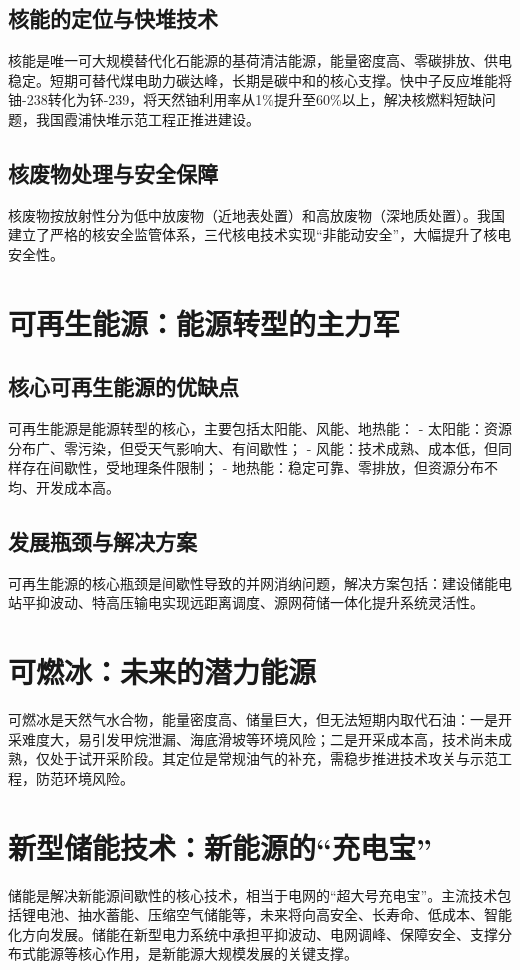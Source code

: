 \documentclass[UTF8,a4paper,12pt]{article}
\begin{document}
\subsection{核能的定位与快堆技术}
核能是唯一可大规模替代化石能源的基荷清洁能源，能量密度高、零碳排放、供电稳定。短期可替代煤电助力碳达峰，长期是碳中和的核心支撑。快中子反应堆能将铀-238转化为钚-239，将天然铀利用率从1\%提升至60\%以上，解决核燃料短缺问题，我国霞浦快堆示范工程正推进建设。

\subsection{核废物处理与安全保障}
核废物按放射性分为低中放废物（近地表处置）和高放废物（深地质处置）。我国建立了严格的核安全监管体系，三代核电技术实现“非能动安全”，大幅提升了核电安全性。

\section{可再生能源：能源转型的主力军}
\subsection{核心可再生能源的优缺点}
可再生能源是能源转型的核心，主要包括太阳能、风能、地热能：
- 太阳能：资源分布广、零污染，但受天气影响大、有间歇性；
- 风能：技术成熟、成本低，但同样存在间歇性，受地理条件限制；
- 地热能：稳定可靠、零排放，但资源分布不均、开发成本高。

\subsection{发展瓶颈与解决方案}
可再生能源的核心瓶颈是间歇性导致的并网消纳问题，解决方案包括：建设储能电站平抑波动、特高压输电实现远距离调度、源网荷储一体化提升系统灵活性。

\section{可燃冰：未来的潜力能源}
可燃冰是天然气水合物，能量密度高、储量巨大，但无法短期内取代石油：一是开采难度大，易引发甲烷泄漏、海底滑坡等环境风险；二是开采成本高，技术尚未成熟，仅处于试开采阶段。其定位是常规油气的补充，需稳步推进技术攻关与示范工程，防范环境风险。

\section{新型储能技术：新能源的“充电宝”}
储能是解决新能源间歇性的核心技术，相当于电网的“超大号充电宝”。主流技术包括锂电池、抽水蓄能、压缩空气储能等，未来将向高安全、长寿命、低成本、智能化方向发展。储能在新型电力系统中承担平抑波动、电网调峰、保障安全、支撑分布式能源等核心作用，是新能源大规模发展的关键支撑。
\end{document}
